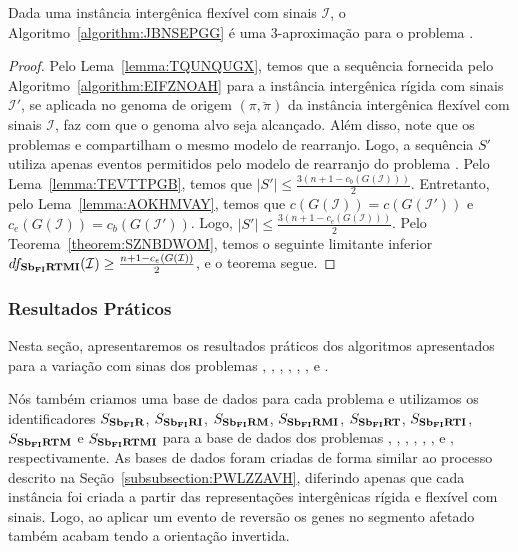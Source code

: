\begin{theorem}\label{theorem:AKZNNSGT}
Dada uma instância intergênica flexível com sinais $\mathcal{I}$, o Algoritmo~\ref{algorithm:JBNSEPGG} é uma $3$-aproximação para o problema \SbFIRTMI{}.
\end{theorem}
\begin{proof}
Pelo Lema~\ref{lemma:TQUNQUGX}, temos que a sequência fornecida pelo Algoritmo~\ref{algorithm:EIFZNOAH} para a instância intergênica rígida com sinais $\mathcal{I'}$, se aplicada no genoma de origem $(\pi,\breve\pi)$ da instância intergênica flexível com sinais $\mathcal{I}$, faz com que o genoma alvo seja alcançado. Além disso, note que os problemas \SbIRTMI{} e \SbFIRTMI{} compartilham o mesmo modelo de rearranjo. Logo, a sequência $S'$ utiliza apenas eventos permitidos pelo modelo de rearranjo do problema \SbFIRTMI{}. Pelo Lema~\ref{lemma:TEVTTPGB}, temos que $|S'| \le \frac{3(n+1 - c_b(G(\mathcal{I})))}{2}$. Entretanto, pelo Lema~\ref{lemma:AOKHMVAY}, temos que $c(G(\mathcal{I})) = c(G(\mathcal{I}'))$ e $c_e(G(\mathcal{I})) = c_b(G(\mathcal{I}'))$. Logo, $|S'| \le \frac{3(n+1 - c_e(G(\mathcal{I})))}{2}$. Pelo Teorema~\ref{theorem:SZNBDWOM}, temos o seguinte limitante inferior $df_{\textbf{Sb\textsubscript{FI}RTMI}}(\mathcal{I}) \ge \frac{n+1 - c_e(G(\mathcal{I}))}{2}$, e o teorema segue.
\end{proof}

\subsubsection{Resultados Práticos}

Nesta seção, apresentaremos os resultados práticos dos algoritmos apresentados para a variação com sinas dos problemas \SbFIR{}, \SbFIRI{}, \SbFIRM{}, \SbFIRMI{}, \SbFIRT{}, \SbFIRTI{}, \SbFIRTM{} e \SbFIRTMI{}.

Nós também criamos uma base de dados para cada problema e utilizamos os identificadores $S_{\textbf{Sb\textsubscript{FI}R}}{}$, $S_{\textbf{Sb\textsubscript{FI}RI}}{}$, $S_{\textbf{Sb\textsubscript{FI}RM}}{}$, $S_{\textbf{Sb\textsubscript{FI}RMI}}{}$, $S_{\textbf{Sb\textsubscript{FI}RT}}{}$, $S_{\textbf{Sb\textsubscript{FI}RTI}}{}$, $S_{\textbf{Sb\textsubscript{FI}RTM}}{}$ e $S_{\textbf{Sb\textsubscript{FI}RTMI}}{}$ para a base de dados dos problemas \SbFIR{}, \SbFIRI{}, \SbFIRM{}, \SbFIRMI{}, \SbFIRT{}, \SbFIRTI{}, \SbFIRTM{} e \SbFIRTMI{}, respectivamente. As bases de dados foram criadas de forma similar ao processo descrito na Seção~\ref{subsubsection:PWLZZAVH}, diferindo apenas que cada instância foi criada a partir das representações intergênicas rígida e flexível com sinais. Logo, ao aplicar um evento de reversão os genes no segmento afetado também acabam tendo a orientação invertida.

